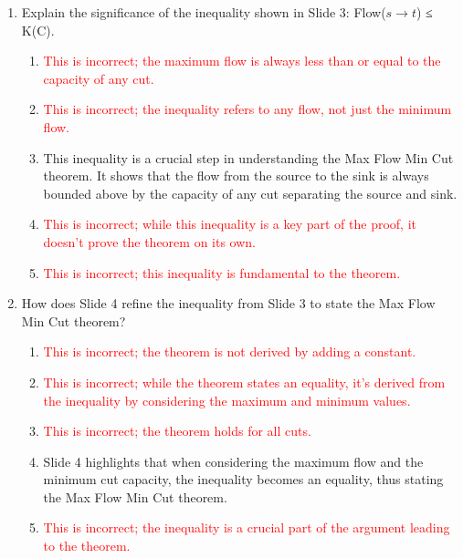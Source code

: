 \documentclass{article}%
\newcommand{\incorrect}[1]{\textcolor{red}{#1}}
\begin{document}
\begin{enumerate}
\begin{enumerate}
\begin{enumerate}
\item \incorrect{This is incorrect; the arcs considered are those going from C to $C^c$, not the other way around.}%
\item \incorrect{This is incorrect; the cut capacity considers multiple arcs, not just a single arc.}%
\item \incorrect{This is incorrect; the cut capacity considers multiple arcs, not just a single arc.}%
\end{enumerate}%
\vspace{0.5em}%
\item Explain the significance of the inequality shown in Slide 3:  Flow($s \to t$) ≤ K(C).%
\begin{enumerate}%
\item \incorrect{This is incorrect; the maximum flow is always less than or equal to the capacity of any cut.}%
\item \incorrect{This is incorrect; the inequality refers to any flow, not just the minimum flow.}%
\item This inequality is a crucial step in understanding the Max Flow Min Cut theorem. It shows that the flow from the source to the sink is always bounded above by the capacity of any cut separating the source and sink.%
\item \incorrect{This is incorrect; while this inequality is a key part of the proof, it doesn't prove the theorem on its own.}%
\item \incorrect{This is incorrect; this inequality is fundamental to the theorem.}%
\end{enumerate}%
\vspace{0.5em}%
\item How does Slide 4 refine the inequality from Slide 3 to state the Max Flow Min Cut theorem?%
\begin{enumerate}%
\item \incorrect{This is incorrect; the theorem is not derived by adding a constant.}%
\item \incorrect{This is incorrect; while the theorem states an equality, it's derived from the inequality by considering the maximum and minimum values.}%
\item \incorrect{This is incorrect; the theorem holds for all cuts.}%
\item Slide 4 highlights that when considering the maximum flow and the minimum cut capacity, the inequality becomes an equality, thus stating the Max Flow Min Cut theorem.%
\item \incorrect{This is incorrect; the inequality is a crucial part of the argument leading to the theorem.}%

\end{enumerate}
\end{enumerate}
\end{enumerate}
\end{document}
